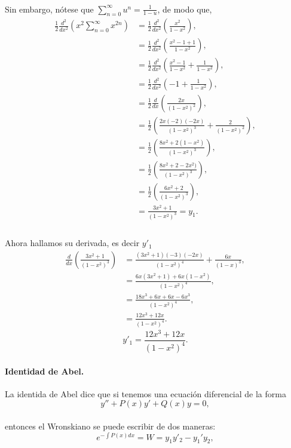 \documentclass{article}
\begin{document}
\paragraph{}Sin embargo, nótese que $\sum_{n=0}^{\infty} u^n = \frac{1}{1 - u}$, de modo que,
\begin{align*}
\frac{1}{2} \frac{d^2}{dx^2} \left(x^2 \sum_{n=0}^{\infty} x^{2n}\right) &= \frac{1}{2} \frac{d^2}{dx^2} \left(\frac{x^2}{1-x^2}\right),\\
&= \frac{1}{2} \frac{d^2}{dx^2} \left(\frac{x^2 - 1 + 1}{1-x^2}\right),\\
&= \frac{1}{2} \frac{d^2}{dx^2} \left(\frac{x^2 - 1}{1-x^2} + \frac{1}{1-x^2}\right),\\
&= \frac{1}{2} \frac{d^2}{dx^2} \left(-1 + \frac{1}{1-x^2}\right),\\
&= \frac{1}{2} \frac{d}{dx} \left(\frac{2x}{(1-x^2)^2}\right),\\
&= \frac{1}{2} \left(\frac{2x(-2)(-2x)}{(1-x^2)^3} + \frac{2}{(1-x^2)^2}\right),\\
&= \frac{1}{2} \left(\frac{8x^2 + 2 (1- x^2)}{(1-x^2)^3}\right),\\
&= \frac{1}{2} \left(\frac{8x^2 + 2 - 2x^2)}{(1-x^2)^3}\right),\\
&= \frac{1}{2} \left(\frac{6x^2 + 2}{(1-x^2)^3}\right),\\
&= \frac{3x^2+1}{(1-x^2)^3} = y_1.\\
\end{align*}
\paragraph{}Ahora hallamos su derivada, es decir $y'_1$
\begin{align*}
\frac{d}{dx} \left(\frac{3x^2+1}{(1-x^2)^3}\right) &= \frac{(3x^2 + 1)(-3)(-2x)}{(1-x^2)^4} + \frac{6x}{(1-x)^3},\\
&= \frac{6x(3x^2 +1) + 6x(1-x^2)}{(1-x^2)^4},\\
&= \frac{18x^3 + 6x + 6x - 6x^3}{(1-x^2)^4},\\
&= \frac{12x^3 + 12x}{(1-x^2)^4}.
\end{align*}
$$y'_1 = \frac{12x^3 + 12x}{(1-x^2)^4}.$$
\paragraph{Identidad de Abel.} La identida de Abel dice que si tenemos una ecuación diferencial  de la forma
$$y'' + P(x)y' +  Q(x) y = 0,$$
\paragraph{}entonces el Wronskiano se puede escribir de dos maneras:
\begin{equation}
e^{-\int P(x) dx} = W = y_1 y'_2 - y_1'y_2 \label{eq:abels_id},
\end{equation}
\end{document}
